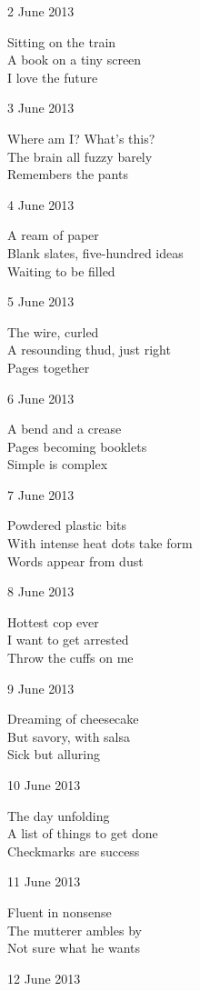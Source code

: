 \documentclass[12pt]{article}
\begin{document}
2 June 2013

Sitting on the train \\
A book on a tiny screen \\
I love the future

\newpage

3 June 2013

Where am I? What's this? \\
The brain all fuzzy barely \\
Remembers the pants

4 June 2013

A ream of paper \\
Blank slates, five-hundred ideas \\
Waiting to be filled

5 June 2013

The wire, curled \\
A resounding thud, just right \\
Pages together

6 June 2013

A bend and a crease \\
Pages becoming booklets \\
Simple is complex

7 June 2013

Powdered plastic bits \\
With intense heat dots take form \\
Words appear from dust

8 June 2013

Hottest cop ever \\
I want to get arrested \\
Throw the cuffs on me

9 June 2013

Dreaming of cheesecake \\
But savory, with salsa \\
Sick but alluring

\newpage

10 June 2013

The day unfolding \\
A list of things to get done \\
Checkmarks are success

11 June 2013

Fluent in nonsense \\
The mutterer ambles by \\
Not sure what he wants

12 June 2013
\end{document}
